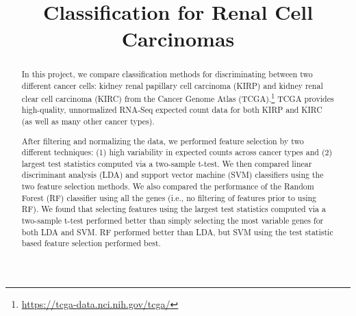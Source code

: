 



\begin{frontmatter}

\title{Classification for Renal Cell Carcinomas}



\begin{abstract}

In this project, we compare classification methods for discriminating between
two different cancer cells: kidney renal papillary cell carcinoma (KIRP) and
kidney renal clear cell carcinoma (KIRC) from the Cancer Genome Atlas
(TCGA).\footnote{\url{https://tcga-data.nci.nih.gov/tcga/}} TCGA provides
high-quality, unnormalized RNA-Seq expected count data for both KIRP and KIRC
(as well as many other cancer types).  

After filtering and normalizing the data, we performed feature selection by two
different techniques:  (1) high variability in expected counts across cancer
types and (2) largest test statistics computed via a two-sample t-test.  We then
compared linear discriminant analysis (LDA) and support vector machine (SVM)
classifiers using the two feature selection methods.  We also compared the
performance of the Random Forest (RF) classifier using all the genes (i.e., no
filtering of features prior to using RF).
We found that selecting features using the largest test statistics computed via
a two-sample t-test performed better than simply selecting the most variable
genes for both LDA and SVM.  RF performed better than LDA, but SVM using
the test statistic based feature selection performed best.

\end{abstract}

\begin{keyword}
\end{keyword}

\end{frontmatter}



